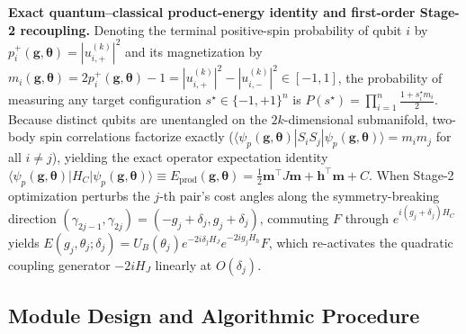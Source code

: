 \documentclass[10pt,a4paper]{article}
\begin{document}
\textbf{Exact quantum--classical product-energy identity and first-order Stage-2 recoupling.} Denoting the terminal positive-spin probability of qubit $i$ by $p_i^+(\boldsymbol{g}, \boldsymbol{\theta}) = |u_{i,+}^{(k)}|^2$ and its magnetization by $m_i(\boldsymbol{g}, \boldsymbol{\theta}) = 2p_i^+(\boldsymbol{g}, \boldsymbol{\theta}) - 1 = |u_{i,+}^{(k)}|^2 - |u_{i,-}^{(k)}|^2 \in [-1, 1]$, the probability of measuring any target configuration $s^\star \in \{-1, +1\}^n$ is $P(s^\star) = \prod_{i=1}^n \frac{1 + s_i^\star m_i}{2}$. Because distinct qubits are unentangled on the $2k$-dimensional submanifold, two-body spin correlations factorize exactly ($\langle\psi_p(\boldsymbol{g}, \boldsymbol{\theta})| S_i S_j |\psi_p(\boldsymbol{g}, \boldsymbol{\theta})\rangle = m_i m_j$ for all $i \ne j$), yielding the exact operator expectation identity $\langle\psi_p(\boldsymbol{g}, \boldsymbol{\theta})| H_C |\psi_p(\boldsymbol{g}, \boldsymbol{\theta})\rangle \equiv E_{\mathrm{prod}}(\boldsymbol{g}, \boldsymbol{\theta}) = \frac{1}{2}\boldsymbol{m}^\top J\boldsymbol{m} + \boldsymbol{h}^\top\boldsymbol{m} + C$. When Stage-2 optimization perturbs the $j$-th pair's cost angles along the symmetry-breaking direction $(\gamma_{2j-1}, \gamma_{2j}) = (-g_j + \delta_j, g_j + \delta_j)$, commuting $F$ through $e^{i(g_j + \delta_j)H_C}$ yields $E(g_j, \theta_j; \delta_j) = U_B(\theta_j) e^{-2i\delta_j H_J} e^{-2i g_j H_h} F$, which re-activates the quadratic coupling generator $-2i H_J$ linearly at $O(\delta_j)$.


\subsection*{Module Design and Algorithmic Procedure}
\end{document}
